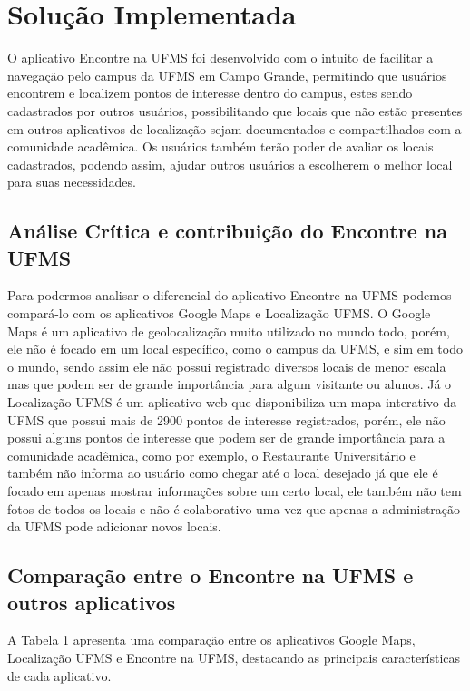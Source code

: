 \section{Solução Implementada}

    O aplicativo Encontre na UFMS foi desenvolvido com o intuito de facilitar a navegação pelo campus da UFMS em Campo Grande, permitindo que usuários encontrem e localizem pontos de interesse dentro do campus, estes sendo cadastrados por outros usuários, possibilitando que locais que não estão presentes em outros aplicativos de localização sejam documentados e compartilhados com a comunidade acadêmica. Os usuários também terão poder de avaliar os locais cadastrados, podendo assim, ajudar outros usuários a escolherem o melhor local para suas necessidades.

\subsection{Análise Crítica e contribuição do Encontre na UFMS}
    Para podermos analisar o diferencial do aplicativo Encontre na UFMS podemos compará-lo com os aplicativos Google Maps e Localização UFMS. O Google Maps é um aplicativo de geolocalização muito utilizado no mundo todo, porém, ele não é focado em um local específico, como o campus da UFMS, e sim em todo o mundo, sendo assim ele não possui registrado diversos locais de menor escala mas que podem ser de grande importância para algum visitante ou alunos. Já o Localização UFMS é um aplicativo web que disponibiliza um mapa interativo da UFMS que possui mais de 2900 pontos de interesse registrados, porém, ele não possui alguns pontos de interesse que podem ser de grande importância para a comunidade acadêmica, como por exemplo, o Restaurante Universitário e também não informa ao usuário como chegar até o local desejado já que ele é focado em apenas mostrar informações sobre um certo local, ele também não tem fotos de todos os locais e não é colaborativo uma vez que apenas a administração da UFMS pode adicionar novos locais.

\newpage

\subsection{Comparação entre o Encontre na UFMS e outros aplicativos}
    A Tabela 1 apresenta uma comparação entre os aplicativos Google Maps, Localização UFMS e Encontre na UFMS, destacando as principais características de cada aplicativo.

